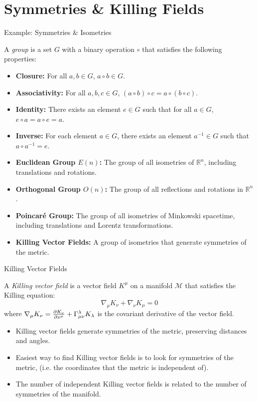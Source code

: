 \documentclass{beamer}
\newcommand{\R}{\mathbb{R}}
\begin{document}
\section{Symmetries \& Killing Fields}
\begin{frame}{Example: Symmetries \& Isometries}
	\footnotesize
	\begin{definition}[Group]
		A \emph{group} is a set $G$ with a binary operation $\circ$ that satisfies the following properties:
		\begin{itemize}
			\item \textbf{Closure:} For all $a, b \in G$, $a \circ b \in G$.
			\item \textbf{Associativity:} For all $a, b, c \in G$, $(a \circ b) \circ c = a \circ (b \circ c)$.
			\item \textbf{Identity:} There exists an element $e \in G$ such that for all $a \in G$, $e \circ a = a \circ e = a$.
			\item \textbf{Inverse:} For each element $a \in G$, there exists an element $a^{-1} \in G$ such that $a \circ a^{-1} = e$.
		\end{itemize}
	\end{definition}

	\begin{itemize}[<+->]
		\item \textbf{Euclidean Group $E(n)$:} The group of all isometries of $\R^n$, including translations and rotations.
		\item \textbf{Orthogonal Group $O(n)$:} The group of all reflections and rotations in $\R^n$.
		\item \textbf{Poincaré Group:} The group of all isometries of Minkowski spacetime, including translations and Lorentz transformations.
		\item \textbf{Killing Vector Fields:} A group of isometries that generate symmetries of the metric. 
	\end{itemize}
\end{frame}

\begin{frame}{Killing Vector Fields}
	\footnotesize
	\begin{definition}
		A \emph{Killing vector field} is a vector field $K^\mu$ on a manifold $\mathcal{M}$ that satisfies the Killing equation:
		\[
			\nabla_\mu K_\nu + \nabla_\nu K_\mu = 0
		\]
		where $\nabla_\mu K_\nu = \pdv{K_\nu}{x^\mu} + \Gamma_{\mu\nu}^\lambda K_\lambda$ is the covariant derivative of the vector field.
	\end{definition}
	\vspace{1ex}
	\pause 
	\begin{itemize}[<+->]
		\item Killing vector fields generate symmetries of the metric, preserving distances and angles.
		\item Easiest way to find Killing vector fields is to look for symmetries of the metric, (i.e. the coordinates that the metric is independent of).
		\item The number of independent Killing vector fields is related to the number of symmetries of the manifold.
	\end{itemize}
\end{frame}
\end{document}
